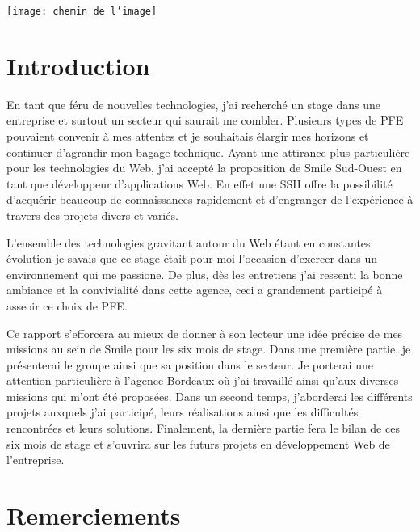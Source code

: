 \documentclass[a4paper,11pt,twoside]{report}
\begin{document}
\sffamily

\texttt{[image: chemin de l'image]}

\clearpage

\chapter*{Introduction}
En tant que féru de nouvelles technologies, j'ai recherché un stage dans une entreprise et surtout un secteur qui saurait me combler. Plusieurs types de PFE pouvaient convenir à mes attentes et je souhaitais élargir mes horizons et continuer d'agrandir mon bagage technique. Ayant une attirance plus particulière pour les technologies du Web, j'ai accepté la proposition de Smile Sud-Ouest en tant que développeur d'applications Web. En effet une SSII offre la possibilité d'acquérir beaucoup de connaissances rapidement et d'engranger de l'expérience à travers des projets divers et variés.\newline

L'ensemble des technologies gravitant autour du Web étant en constantes évolution je savais que ce stage était pour moi l'occasion d'exercer dans un environnement qui me passione. De plus, dès les entretiens j'ai ressenti la bonne ambiance et la convivialité dans cette agence, ceci a grandement participé à asseoir ce choix de PFE.\newline 

Ce rapport s’efforcera au mieux de donner à son lecteur une idée précise de mes missions au sein de Smile pour les six mois de stage. Dans une première partie, je présenterai le groupe ainsi que sa position dans le secteur. Je porterai une attention particulière à l'agence Bordeaux où j'ai travaillé ainsi qu'aux diverses missions qui m'ont été proposées. Dans un second temps, j’aborderai les différents projets auxquels j'ai participé, leurs réalisations ainsi que les difficultés rencontrées et leurs solutions. Finalement, la dernière partie fera le bilan de ces six mois de stage et s'ouvrira sur les futurs projets en développement Web de l’entreprise.

\chapter*{Remerciements}
\end{document}
